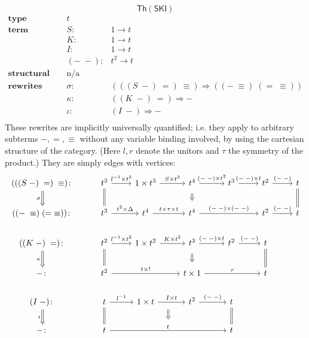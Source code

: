 \documentclass{amsart}
\theoremstyle{definition}
\newcommand{\Th}{\mathsf{Th}}
\newcommand{\maps}{\colon}
\begin{document}
$$\Th(\mathsf{SKI})$$
\[\begin{array}{lrl}
\textbf{type} & t &\\
\textbf{term constructors} & S\maps & 1 \to t\\
& K\maps & 1 \to t\\
& I\maps & 1 \to t\\
& (-\; -)\maps &  t^2 \to t\\
\textbf{structural congruence} & \text{n/a} &\\
\textbf{rewrites} & \sigma\maps & (((S\; -)\; =)\; \equiv) \Rightarrow ((-\; \equiv)\; (=\; \equiv))\\
& \kappa\maps & ((K\; -)\; =) \Rightarrow -\\
& \iota\maps & (I\; -) \Rightarrow -\\
\end{array}\]
These rewrites are implicitly universally quantified; i.e. they apply to arbitrary subterms $-, =, \equiv$ without any variable binding involved, by using the cartesian structure of the category. (Here $l,r$ denote the unitors and $\tau$ the symmetry of the product.) They are simply edges with vertices:
\[\begin{tikzcd}
(((S\; -)\; =)\; \equiv)\maps \arrow[Rightarrow,d,swap,"\sigma"] & t^3 \arrow[d,equal] \arrow[r,"l^{-1} \times t^3"] & 1\times t^3 \arrow[r,"S \times t^3"] & t^4 \arrow[Rightarrow,d,shorten >=0.2cm,shorten <=0.2cm] \arrow[r,"(-\;-)\times t^2"] & t^3 \arrow[r,"(-\;-) \times t"] & t^2 \arrow[r,"(-\;-)"] & t\arrow[d,equal]\\
((-\; \equiv)\; (=\; \equiv))\maps & t^3 \arrow[r,"t^2 \times \Delta"] & t^4 \arrow[r,"t \times \tau \times t"]& t^4 \arrow[rr,"(-\;-) \times (-\;-)"]&& t^2 \arrow[r,"(-\;-)"]& t\\
((K\; -)\; =)\maps \arrow[Rightarrow,d,swap,"\kappa"] & t^2 \arrow[d,equal] \arrow[r,"l^{-1} \times t^2"] & 1\times t^2 \arrow[r,"K \times t^2"] & t^3 \arrow[Rightarrow,d,shorten >=0.2cm,shorten <=0.2cm] \arrow[r,"(-\;-)\times t"] & t^2 \arrow[r,"(-\;-)"] & t \arrow[d,equal]\\
-\maps & t^2 \arrow[rr,"t \times !"] && t \times 1 \arrow[rr,"r"] && t\\
(I\; -)\maps \arrow[Rightarrow,d,swap,"\iota"] & t \arrow[d,equal] \arrow[r,"l^{-1}"] & 1\times t \arrow[r,"I \times t",""name=1] & t^2 \arrow[r,"(-\;-)"] & t \arrow[d,equal]\\
-\maps & t \arrow[rrr,"t",""name=2] \arrow[Rightarrow,from=1,to=2,start anchor={[xshift=-0.8ex]},shorten >=0.3cm,shorten <=0.3cm] &&& t
\end{tikzcd}\]
\end{document}
